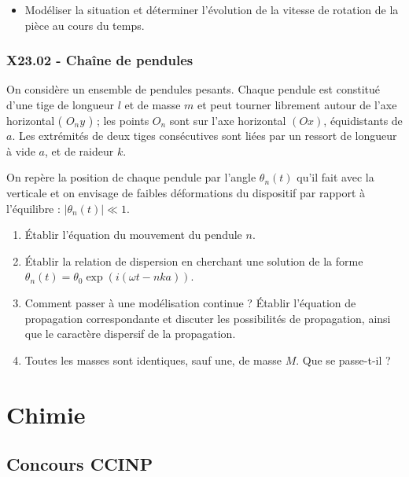 \begin{itemize}[label=\textbullet]
    \item Modéliser la situation et déterminer l'évolution de la vitesse de rotation de la pièce au cours du temps.
\end{itemize}

\subsubsection*{X23.02 - Chaîne de pendules }

On considère un ensemble de pendules pesants. Chaque pendule est constitué d'une tige de longueur $l$ et de masse $m$ et peut tourner librement autour de l'axe horizontal ( $O_n y$ ) ; les points $O_n$ sont sur l'axe horizontal $(O x)$, équidistants de $a$. Les extrémités de deux tiges consécutives sont liées par un ressort de longueur à vide $a$, et de raideur $k$.

On repère la position de chaque pendule par l'angle $\theta_n(t)$ qu'il fait avec la verticale et on envisage de faibles déformations du dispositif par rapport à l'équilibre : $\left|\theta_n(t)\right| \ll 1$.

\begin{enumerate}
\item Établir l'équation du mouvement du pendule $n$.
\item Établir la relation de dispersion en cherchant une solution de la forme $\theta_n(t)=\theta_0 \exp (i(\omega t-n k a))$.
\item Comment passer à une modélisation continue ? Établir l'équation de propagation correspondante et discuter les possibilités de propagation, ainsi que le caractère dispersif de la propagation.
\item Toutes les masses sont identiques, sauf une, de masse $M$. Que se passe-t-il ?
\end{enumerate}


\newpage
\section*{Chimie}

\subsection*{Concours CCINP}


